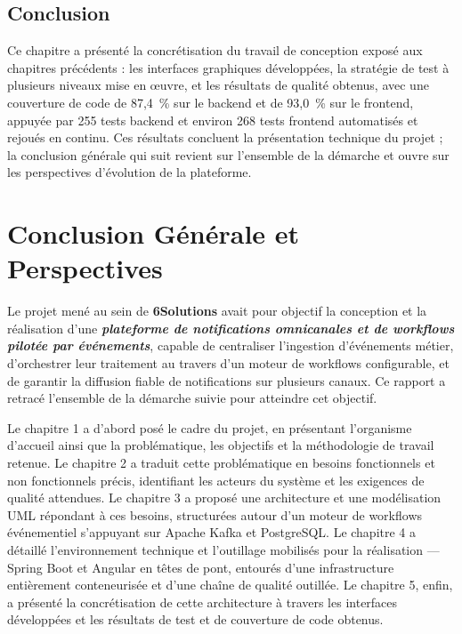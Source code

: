 \documentclass[12pt,a4paper]{report}
\begin{document}
\section*{Conclusion}

Ce chapitre a présenté la concrétisation du travail de conception exposé aux chapitres précédents : les interfaces graphiques développées, la stratégie de test à plusieurs niveaux mise en \oe uvre, et les résultats de qualité obtenus, avec une couverture de code de 87,4~\% sur le backend et de 93,0~\% sur le frontend, appuyée par 255 tests backend et environ 268 tests frontend automatisés et rejoués en continu. Ces résultats concluent la présentation technique du projet ; la conclusion générale qui suit revient sur l'ensemble de la démarche et ouvre sur les perspectives d'évolution de la plateforme.

\chapter*{Conclusion Générale et Perspectives}

Le projet mené au sein de \textbf{6Solutions} avait pour objectif la conception et la réalisation d'une \textbf{\textit{plateforme de notifications omnicanales et de workflows pilotée par événements}}, capable de centraliser l'ingestion d'événements métier, d'orchestrer leur traitement au travers d'un moteur de workflows configurable, et de garantir la diffusion fiable de notifications sur plusieurs canaux. Ce rapport a retracé l'ensemble de la démarche suivie pour atteindre cet objectif.

Le chapitre 1 a d'abord posé le cadre du projet, en présentant l'organisme d'accueil ainsi que la problématique, les objectifs et la méthodologie de travail retenue. Le chapitre 2 a traduit cette problématique en besoins fonctionnels et non fonctionnels précis, identifiant les acteurs du système et les exigences de qualité attendues. Le chapitre 3 a proposé une architecture et une modélisation UML répondant à ces besoins, structurées autour d'un moteur de workflows événementiel s'appuyant sur Apache Kafka et PostgreSQL. Le chapitre 4 a détaillé l'environnement technique et l'outillage mobilisés pour la réalisation --- Spring Boot et Angular en têtes de pont, entourés d'une infrastructure entièrement conteneurisée et d'une chaîne de qualité outillée. Le chapitre 5, enfin, a présenté la concrétisation de cette architecture à travers les interfaces développées et les résultats de test et de couverture de code obtenus.
\end{document}
